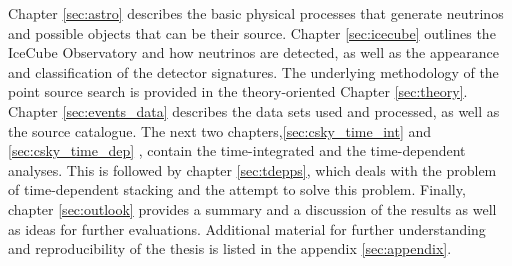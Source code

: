 Chapter \ref{sec:astro} describes the basic physical processes that generate neutrinos and possible objects that can be their source.
Chapter \ref{sec:icecube} outlines the IceCube Observatory and how neutrinos are detected, as well as the appearance and classification of the detector signatures.
The underlying methodology of the point source search is provided in the theory-oriented Chapter \ref{sec:theory}.
Chapter \ref{sec:events_data} describes the data sets used and processed, as well as the source catalogue.
The next two chapters,\ref{sec:csky_time_int} and \ref{sec:csky_time_dep} , contain the time-integrated and the time-dependent analyses.
This is followed by chapter \ref{sec:tdepps}, which deals with the problem of time-dependent stacking and the attempt to solve this problem.
Finally, chapter \ref{sec:outlook} provides a summary and a discussion of the results as well as ideas for further evaluations.
Additional material for further understanding and reproducibility of the thesis is listed in the appendix \ref{sec:appendix}.
